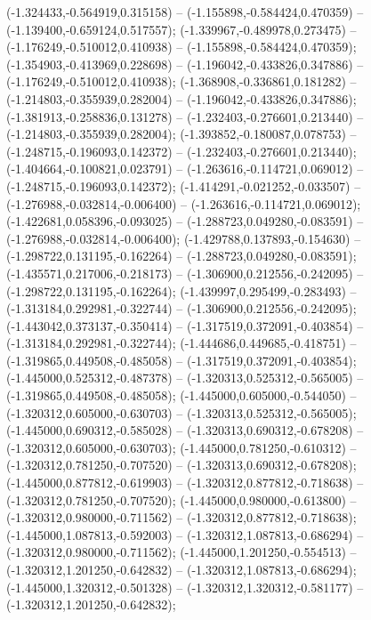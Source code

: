  (-1.324433,-0.564919,0.315158) -- (-1.155898,-0.584424,0.470359) -- (-1.139400,-0.659124,0.517557);
 (-1.339967,-0.489978,0.273475) -- (-1.176249,-0.510012,0.410938) -- (-1.155898,-0.584424,0.470359);
 (-1.354903,-0.413969,0.228698) -- (-1.196042,-0.433826,0.347886) -- (-1.176249,-0.510012,0.410938);
 (-1.368908,-0.336861,0.181282) -- (-1.214803,-0.355939,0.282004) -- (-1.196042,-0.433826,0.347886);
 (-1.381913,-0.258836,0.131278) -- (-1.232403,-0.276601,0.213440) -- (-1.214803,-0.355939,0.282004);
 (-1.393852,-0.180087,0.078753) -- (-1.248715,-0.196093,0.142372) -- (-1.232403,-0.276601,0.213440);
 (-1.404664,-0.100821,0.023791) -- (-1.263616,-0.114721,0.069012) -- (-1.248715,-0.196093,0.142372);
 (-1.414291,-0.021252,-0.033507) -- (-1.276988,-0.032814,-0.006400) -- (-1.263616,-0.114721,0.069012);
 (-1.422681,0.058396,-0.093025) -- (-1.288723,0.049280,-0.083591) -- (-1.276988,-0.032814,-0.006400);
 (-1.429788,0.137893,-0.154630) -- (-1.298722,0.131195,-0.162264) -- (-1.288723,0.049280,-0.083591);
 (-1.435571,0.217006,-0.218173) -- (-1.306900,0.212556,-0.242095) -- (-1.298722,0.131195,-0.162264);
 (-1.439997,0.295499,-0.283493) -- (-1.313184,0.292981,-0.322744) -- (-1.306900,0.212556,-0.242095);
 (-1.443042,0.373137,-0.350414) -- (-1.317519,0.372091,-0.403854) -- (-1.313184,0.292981,-0.322744);
 (-1.444686,0.449685,-0.418751) -- (-1.319865,0.449508,-0.485058) -- (-1.317519,0.372091,-0.403854);
 (-1.445000,0.525312,-0.487378) -- (-1.320313,0.525312,-0.565005) -- (-1.319865,0.449508,-0.485058);
 (-1.445000,0.605000,-0.544050) -- (-1.320312,0.605000,-0.630703) -- (-1.320313,0.525312,-0.565005);
 (-1.445000,0.690312,-0.585028) -- (-1.320313,0.690312,-0.678208) -- (-1.320312,0.605000,-0.630703);
 (-1.445000,0.781250,-0.610312) -- (-1.320312,0.781250,-0.707520) -- (-1.320313,0.690312,-0.678208);
 (-1.445000,0.877812,-0.619903) -- (-1.320312,0.877812,-0.718638) -- (-1.320312,0.781250,-0.707520);
 (-1.445000,0.980000,-0.613800) -- (-1.320312,0.980000,-0.711562) -- (-1.320312,0.877812,-0.718638);
 (-1.445000,1.087813,-0.592003) -- (-1.320312,1.087813,-0.686294) -- (-1.320312,0.980000,-0.711562);
 (-1.445000,1.201250,-0.554513) -- (-1.320312,1.201250,-0.642832) -- (-1.320312,1.087813,-0.686294);
 (-1.445000,1.320312,-0.501328) -- (-1.320312,1.320312,-0.581177) -- (-1.320312,1.201250,-0.642832);
